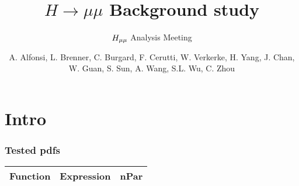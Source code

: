 \documentclass[xcolor={x11names}]{beamer}
\title{$H\to\mu\mu$ Background study}
\subtitle{\texorpdfstring{$H\sb{\mu\mu}$ Analysis Meeting}{Hmumu analysis meeting}}
\author{A. Alfonsi, L. Brenner, C. Burgard, F. Cerutti, W. Verkerke, H. Yang, J. Chan, W. Guan, S. Sun, A. Wang, S.L. Wu, C. Zhou}
\begin{document}
\frame{\maketitle}


\section{Intro}
\begin{frame}[fragile,shrink=25]
\frametitle{Tested pdfs}
\begin{table}
{
\centering

\begin{tabular}{l l c}
\textcolor{Red3}{\textbf{Function}} & \textcolor{Red3}{\textbf{Expression}} & \textcolor{Red3}{\textbf{nPar}} \\
\midrule


\end{tabular}}
\end{table}
\end{frame}
\end{document}
